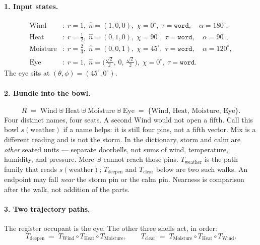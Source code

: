 \documentclass[12pt, a4paper]{article}
\begin{document}
\paragraph{1. Input states.}
\begin{align*}
\mathrm{Wind}&:
  \; r=1,\;
  \hat n=(1,0,0),\;
  \chi=0^\circ,\;
  \tau=\mathtt{word},
  \quad \alpha=180^\circ,\\
\mathrm{Heat}&:
  \; r=\tfrac12,\;
  \hat n=(0,1,0),\;
  \chi=90^\circ,\;
  \tau=\mathtt{word},
  \quad \alpha=90^\circ,\\
\mathrm{Moisture}&:
  \; r=\tfrac23,\;
  \hat n=(0,0,1),\;
  \chi=45^\circ,\;
  \tau=\mathtt{word},
  \quad \alpha=120^\circ,\\
\mathrm{Eye}&:
  \; r=1,\;
  \hat n=\bigl(\tfrac{\sqrt{2}}{2},\,0,\,\tfrac{\sqrt{2}}{2}\bigr),\;
  \chi=0^\circ,\;
  \tau=\mathtt{word}.
\end{align*}
The eye sits at $(\theta,\phi)=(45^\circ,0^\circ)$.

\paragraph{2. Bundle into the bowl.}
\begin{equation}
    R
    \;=\;
    \mathrm{Wind}\uplus\mathrm{Heat}\uplus\mathrm{Moisture}\uplus\mathrm{Eye}
    \;=\;
    \{\mathrm{Wind},\,\mathrm{Heat},\,\mathrm{Moisture},\,\mathrm{Eye}\}.
    \label{eq:storm_bowl}
\end{equation}
Four distinct names, four seats. A second $\mathrm{Wind}$ would not
open a fifth. Call this bowl $s(\mathrm{weather})$ if a name helps:
it is still four pins, not a fifth vector. Mix is a different
reading and is not the storm.
In the dictionary, $\mathrm{storm}$ and $\mathrm{calm}$ are
\emph{other} seated units --- separate doorbells, not sums of
wind, temperature, humidity, and pressure. Mere $\uplus$ cannot
reach those pins. $T_{\mathrm{weather}}$ is the path family that
reads $s(\mathrm{weather})$; $T_{\mathrm{deepen}}$ and
$T_{\mathrm{clear}}$ below are two such walks. An endpoint may
fall \emph{near} the storm pin or the calm pin. Nearness is
comparison after the walk, not addition of the parts.

\paragraph{3. Two trajectory paths.}
The register occupant is the eye. The other three shells act, in order:
\begin{equation}
    T_{\mathrm{deepen}}
    \;=\;
    T_{\mathrm{Wind}}\circ T_{\mathrm{Heat}}\circ T_{\mathrm{Moisture}},
    \qquad
    T_{\mathrm{clear}}
    \;=\;
    T_{\mathrm{Moisture}}\circ T_{\mathrm{Heat}}\circ T_{\mathrm{Wind}}.
\end{equation}
\end{document}
